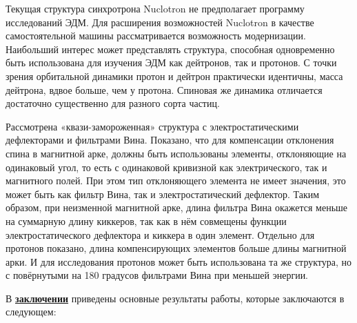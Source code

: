 \par Текущая структура синхротрона Nuclotron не предполагает программу исследований ЭДМ. Для расширения возможностей Nuclotron в качестве самостоятельной машины рассматривается возможность модернизации. Наибольший интерес может представлять структура, способная одновременно быть использована для изучения ЭДМ как дейтронов, так и протонов. С точки зрения орбитальной динамики протон и дейтрон практически идентичны, масса дейтрона, вдвое больше, чем у протона. Спиновая же динамика отличается достаточно существенно для разного сорта частиц. 

\noindent Рассмотрена «квази-замороженная» структура с электростатическими дефлекторами и фильтрами Вина. Показано, что для компенсации отклонения спина в магнитной арке, должны быть использованы элементы, отклоняющие на одинаковый угол, то есть с одинаковой кривизной как электрического, так и магнитного полей. При этом тип отклоняющего элемента не имеет значения, это может быть как фильтр Вина, так и электростатический дефлектор. Таким образом, при неизменной магнитной арке, длина фильтра Вина окажется меньше на суммарную длину киккеров, так как в нём совмещены функции электростатического дефлектора и киккера в один элемент. Отдельно для протонов показано, длина компенсирующих элементов больше длины магнитной арки. И для исследования протонов может быть использована та же структура, но с повёрнутыми на 180 градусов фильтрами Вина при меньшей энергии. \cite{Kolokolchikov:2021trans}

\FloatBarrier
{}                                  %

В \underline{\textbf{заключении}} приведены основные результаты работы, которые заключаются в следующем:



